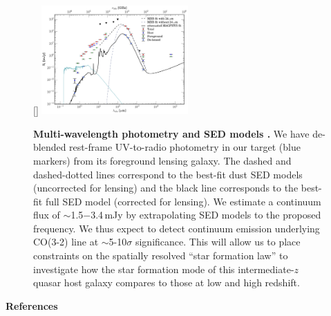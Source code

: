 \documentclass[11pt,a4paper,twoside,graphicx,color]{article}
\newcommand{\cco}{\mbox{CO(3-2)}\xspace}
\newcommand{\ssim}{\,$\sim$\,}
\newcommand{\SF}{star formation\xspace}
\newcommand{\interz}{intermediate-$z$\xspace}
\begin{document}
\begin{figure}[!htbp]
\vspace{-1.15em}
\hspace{-1.95em}
\centering
{}
[\FBwidth]
{
\includegraphics[trim=5 0 13 0, clip, angle=0,
width=0.50\textwidth]{Figures/FullSED_withMagphys}} 
{
\hspace{-0.95em}
\caption{ 
\textbf{Multi-wavelength photometry and SED models
\citep{Leung16b}.}
We have de-blended rest-frame UV-to-radio 
photometry in our target 
(blue markers) from its foreground lensing galaxy.
The dashed and dashed-dotted lines correspond to the best-fit dust 
SED models (uncorrected for lensing) 
and
the black line corresponds to the best-fit full SED model (corrected for lensing).
We estimate a continuum flux of
$\sim$1.5$-$3.4\,mJy
by extrapolating SED models to the proposed frequency.
We thus expect to detect continuum emission underlying \cco line at $\sim$5-10$\sigma$ significance.
This will allow us to place constraints on the spatially resolved 
``\SF law'' to investigate how the \SF mode of this \interz quasar host galaxy compares 
to those at low and high redshift.
\label{fig:SED}}}
\vspace{-0.85em}
\end{figure}

\noindent \textbf{References}
{\fontsize{11pt}{11pt}\selectfont
	
}
\end{document}
